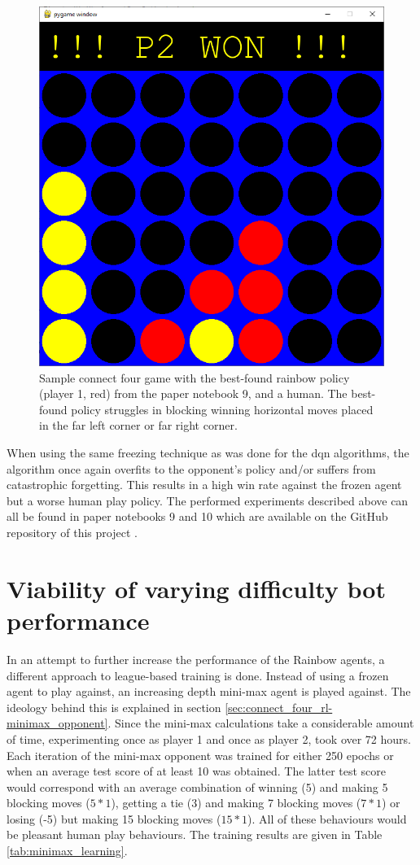 \begin{figure}[ht]
    \centering
    \includegraphics[width=0.7\linewidth]{images/rainbow_failed_policy.png}
    \captionsetup{width=0.9\linewidth}
    \captionsetup{justification=centering}
    \caption{Sample connect four game with the best-found rainbow policy (player 1, red) from the paper notebook 9, and a human. The best-found policy struggles in blocking winning horizontal moves placed in the far left corner or far right corner.}
    \label{fig:rainbow_failed}
\end{figure}

When using the same freezing technique as was done for the \gls{dqn} algorithms, the algorithm once again overfits to the opponent's policy and/or suffers from catastrophic forgetting.
This results in a high win rate against the frozen agent but a worse human play policy.
The performed experiments described above can all be found in paper notebooks 9 and 10 which are available on the GitHub repository of this project \citep{github_project}.


\section{Viability of varying difficulty bot performance}
\label{sec:connect_four_eval-varying_difficulty}

In an attempt to further increase the performance of the Rainbow agents, a different approach to league-based training is done.
Instead of using a frozen agent to play against, an increasing depth mini-max agent is played against.
The ideology behind this is explained in section \ref{sec:connect_four_rl-minimax_opponent}.
Since the mini-max calculations take a considerable amount of time, experimenting once as player 1 and once as player 2, took over 72 hours.
Each iteration of the mini-max opponent was trained for either 250 epochs or when an average test score of at least 10 was obtained.
The latter test score would correspond with an average combination of winning (5) and making 5 blocking moves ($5*1$), getting a tie (3) and making 7 blocking moves ($7*1$) or losing (-5) but making 15 blocking moves ($15*1$).
All of these behaviours would be pleasant human play behaviours.
The training results are given in Table \ref{tab:minimax_learning}.

